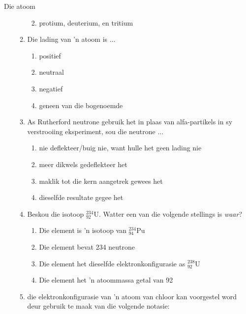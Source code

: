 \begin{eocexercises}{Die atoom}
\begin{enumerate}[noitemsep, label=\textbf{\arabic*}. ]
\begin{enumerate}[noitemsep, label=\textbf{\alph*}. ]
\begin{enumerate}[noitemsep, label=\textbf{\alph*}. ]
\label{m38741*uid202}\item protium, deuterium, en tritium
\end{enumerate}
                \label{m38741*uid203}\item Die lading van 'n atoom is ...
\label{m38741*id263355}\begin{enumerate}[noitemsep, label=\textbf{\alph*}. ] 
            \label{m38741*uid204}\item positief
\label{m38741*uid205}\item neutraal
\label{m38741*uid206}\item negatief
\item geneen van die bogenoemde
\end{enumerate}
                \label{m38741*uid207}\item As Rutherford neutrone gebruik het in plaas van alfa-partikels in sy verstrooiing eksperiment, sou die neutrone ...
\label{m38741*id263410}\begin{enumerate}[noitemsep, label=\textbf{\alph*}. ] 
            \label{m38741*uid208}\item nie deflekteer/buig nie, want hulle het geen lading nie
\label{m38741*uid209}\item meer dikwels gedeflekteer het
\label{m38741*uid210}\item maklik tot die kern aangetrek gewees het
\label{m38741*uid211}\item dieselfde resultate gegee het
\end{enumerate}
                \label{m38741*uid212}\item Beskou die isotoop $_{92}^{234}\text{U}$. Watter een van die volgende stellings is \textsl{waar}?
\label{m38741*id263500}\begin{enumerate}[noitemsep, label=\textbf{\alph*}. ] 
            \label{m38741*uid213}\item Die element is 'n isotoop van $_{94}^{234}\text{Pu}$
\label{m38741*uid214}\item Die element bevat 234 neutrone
\label{m38741*uid215}\item Die element het dieselfde elektronkonfigurasie as $_{92}^{238}\text{U}$
\label{m38741*uid216}\item Die element het 'n atoommassa getal van 92
\end{enumerate}
                \label{m38741*uid217}\item die elektronkonfigurasie van 'n atoom van chloor kan voorgestel word deur gebruik te maak van die volgende notasie:
\label{m38741*id263598}\begin{enumerate}[noitemsep, label=\textbf{\alph*}. ] 

\end{enumerate}
\end{enumerate}
\end{enumerate}
\end{eocexercises}
